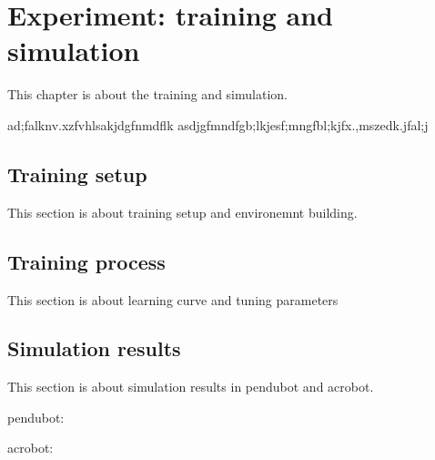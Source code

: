\chapter{Experiment: training and simulation}
This chapter is about the training and simulation.

ad;falknv.xzfvhlsakjdgfnmdflk asdjgfmndfgb;lkjesf;mngfbl;kjfx.,mszedk.jfal;j

\section{Training setup}
This section is about training setup and environemnt building.

\section{Training process}
This section is about learning curve and tuning parameters

\section{Simulation results}
This section is about simulation results in pendubot and acrobot.

pendubot:

acrobot:


\cleardoublepage
